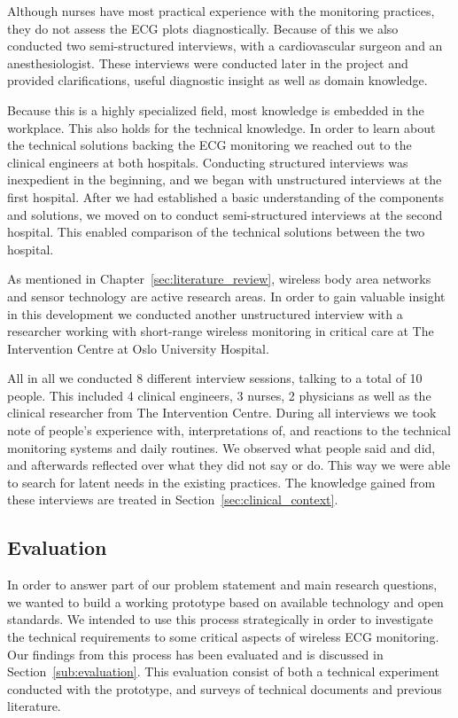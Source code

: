 Although nurses have most practical experience with the monitoring practices, they do not assess the ECG plots diagnostically. Because of this we also conducted two semi-structured interviews, with a cardiovascular surgeon and an anesthesiologist. These interviews were conducted later in the project and provided clarifications, useful diagnostic insight as well as domain knowledge.

Because this is a highly specialized field, most knowledge is embedded in the workplace. This also holds for the technical knowledge. In order to learn about the technical solutions backing the ECG monitoring we reached out to the clinical engineers at both hospitals. Conducting structured interviews was inexpedient in the beginning, and we began with unstructured interviews at the first hospital. After we had established a basic understanding of the components and solutions, we moved on to conduct semi-structured interviews at the second hospital. This enabled comparison of the technical solutions between the two hospital.

As mentioned in Chapter~\ref{sec:literature_review}, wireless body area networks and sensor technology are active research areas. In order to gain valuable insight in this development we conducted another unstructured interview with a researcher working with short-range wireless monitoring in critical care at The Intervention Centre at Oslo University Hospital.

All in all we conducted 8 different interview sessions, talking to a total of 10 people. This included 4 clinical engineers, 3 nurses, 2 physicians as well as the clinical researcher from The Intervention Centre. During all interviews we took note of people's experience with, interpretations of, and reactions to the technical monitoring systems and daily routines. We observed what people said and did, and afterwards reflected over what they did not say or do. This way we were able to search for latent needs in the existing practices. The knowledge gained from these interviews are treated in Section~\ref{sec:clinical_context}.


\subsection{Evaluation} %
\label{sub:experiments}

In order to answer part of our problem statement and main research questions, we wanted to build a working prototype based on available technology and open standards. We intended to use this process strategically in order to investigate the technical requirements to some critical aspects of wireless ECG monitoring. Our findings from this process has been evaluated and is discussed in Section~\ref{sub:evaluation}. This evaluation consist of both a technical experiment conducted with the prototype, and surveys of technical documents and previous literature.


